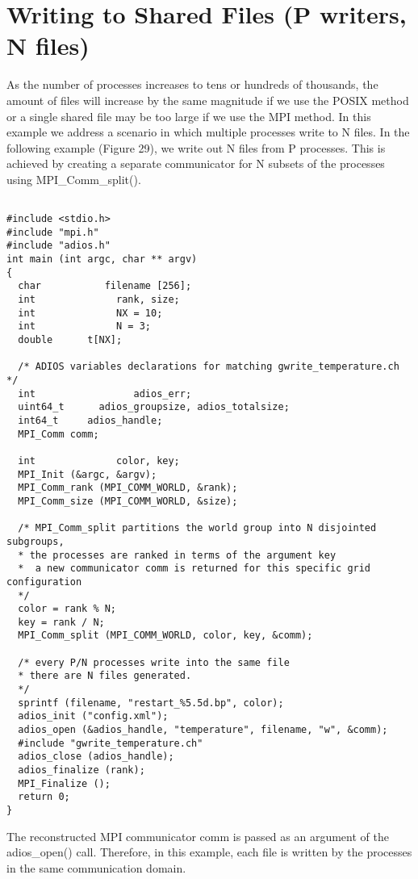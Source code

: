\section{Writing to Shared Files (P writers, N files)}

As the number of processes increases to tens or hundreds of thousands, the amount 
of files will increase by the same magnitude if we use the POSIX method or a single 
shared file may be too large if we use the MPI method. In this example we address 
a scenario in which multiple processes write to N files. In the following example 
(Figure 29), we write out N files from P processes. This is achieved by creating 
a separate communicator for N subsets of the processes using
MPI\_Comm\_split(). 

\begin{lstlisting}[alsolanguage=C,caption=Example ADIOS program writing N files
  from P processors (N)]

#include <stdio.h>
#include "mpi.h"
#include "adios.h"
int main (int argc, char ** argv) 
{
  char           filename [256];
  int              rank, size;
  int              NX = 10; 
  int              N = 3;
  double      t[NX];
  
  /* ADIOS variables declarations for matching gwrite_temperature.ch */
  int                 adios_err;
  uint64_t      adios_groupsize, adios_totalsize;
  int64_t     adios_handle;
  MPI_Comm comm;

  int              color, key;
  MPI_Init (&argc, &argv);
  MPI_Comm_rank (MPI_COMM_WORLD, &rank);
  MPI_Comm_size (MPI_COMM_WORLD, &size);
  
  /* MPI_Comm_split partitions the world group into N disjointed  subgroups, 
  * the processes are ranked in terms of the argument key  
  *  a new communicator comm is returned for this specific grid configuration
  */
  color = rank % N;
  key = rank / N;
  MPI_Comm_split (MPI_COMM_WORLD, color, key, &comm);
  
  /* every P/N processes write into the same file 
  * there are N files generated. 
  */
  sprintf (filename, "restart_%5.5d.bp", color);
  adios_init ("config.xml");
  adios_open (&adios_handle, "temperature", filename, "w", &comm);
  #include "gwrite_temperature.ch"
  adios_close (adios_handle);
  adios_finalize (rank);
  MPI_Finalize ();
  return 0;
}
\end{lstlisting}


The reconstructed MPI communicator comm is passed as an argument of the adios\_open() 
call. Therefore, in this example, each file is written by the processes in the 
same communication domain.

